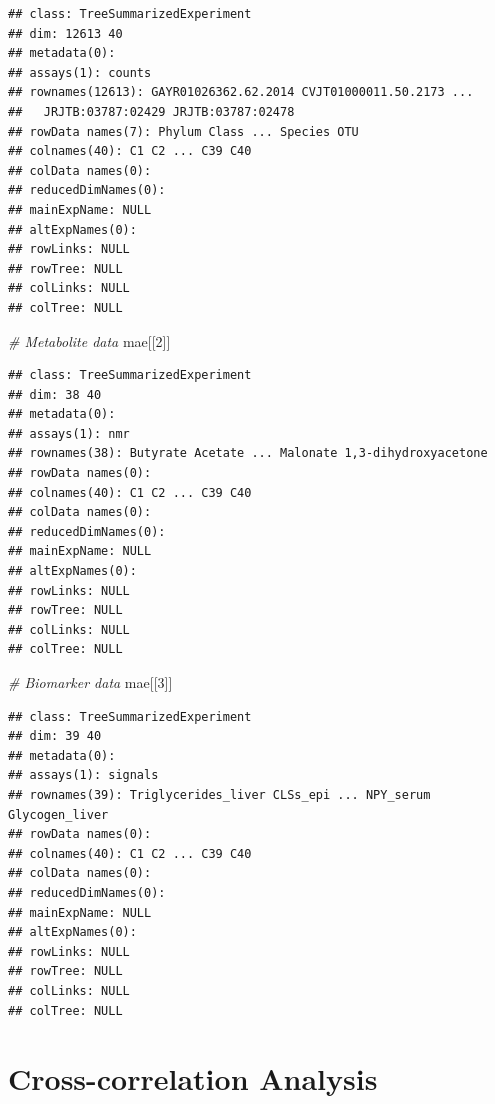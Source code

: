 \documentclass[
]{book}
\newenvironment{Shaded}{\begin{snugshade}}{\end{snugshade}}
\newcommand{\CommentTok}[1]{\textcolor[rgb]{0.56,0.35,0.01}{\textit{#1}}}
\newcommand{\DecValTok}[1]{\textcolor[rgb]{0.00,0.00,0.81}{#1}}
\newcommand{\NormalTok}[1]{#1}
\begin{document}
\begin{verbatim}
## class: TreeSummarizedExperiment 
## dim: 12613 40 
## metadata(0):
## assays(1): counts
## rownames(12613): GAYR01026362.62.2014 CVJT01000011.50.2173 ...
##   JRJTB:03787:02429 JRJTB:03787:02478
## rowData names(7): Phylum Class ... Species OTU
## colnames(40): C1 C2 ... C39 C40
## colData names(0):
## reducedDimNames(0):
## mainExpName: NULL
## altExpNames(0):
## rowLinks: NULL
## rowTree: NULL
## colLinks: NULL
## colTree: NULL
\end{verbatim}

\begin{Shaded}
\begin{Highlighting}[]
\CommentTok{\# Metabolite data}
\NormalTok{mae[[}\DecValTok{2}\NormalTok{]]}
\end{Highlighting}
\end{Shaded}

\begin{verbatim}
## class: TreeSummarizedExperiment 
## dim: 38 40 
## metadata(0):
## assays(1): nmr
## rownames(38): Butyrate Acetate ... Malonate 1,3-dihydroxyacetone
## rowData names(0):
## colnames(40): C1 C2 ... C39 C40
## colData names(0):
## reducedDimNames(0):
## mainExpName: NULL
## altExpNames(0):
## rowLinks: NULL
## rowTree: NULL
## colLinks: NULL
## colTree: NULL
\end{verbatim}

\begin{Shaded}
\begin{Highlighting}[]
\CommentTok{\# Biomarker data}
\NormalTok{mae[[}\DecValTok{3}\NormalTok{]]}
\end{Highlighting}
\end{Shaded}

\begin{verbatim}
## class: TreeSummarizedExperiment 
## dim: 39 40 
## metadata(0):
## assays(1): signals
## rownames(39): Triglycerides_liver CLSs_epi ... NPY_serum Glycogen_liver
## rowData names(0):
## colnames(40): C1 C2 ... C39 C40
## colData names(0):
## reducedDimNames(0):
## mainExpName: NULL
## altExpNames(0):
## rowLinks: NULL
## rowTree: NULL
## colLinks: NULL
## colTree: NULL
\end{verbatim}

\hypertarget{cross-correlation}{%
\section{Cross-correlation Analysis}\label{cross-correlation}}
\end{document}
